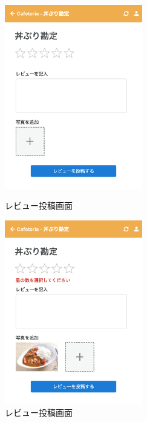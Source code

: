 \documentclass[a4paper]{ltjsarticle}
\begin{document}
        \begin{figure}[ht]
            \begin{minipage}[t]{.49\textwidth}
                \center
                \includegraphics[width=60mm]{ui/new-review.png}
                \caption{レビュー投稿画面}
                \label{img:new-review}
            \end{minipage}
            \begin{minipage}[t]{.49\textwidth}
                \center
                \includegraphics[width=60mm]{ui/new-review-error.png}
                \caption{レビュー投稿画面}
                \label{img:new-review-error}
            \end{minipage}
        \end{figure}
\end{document}
